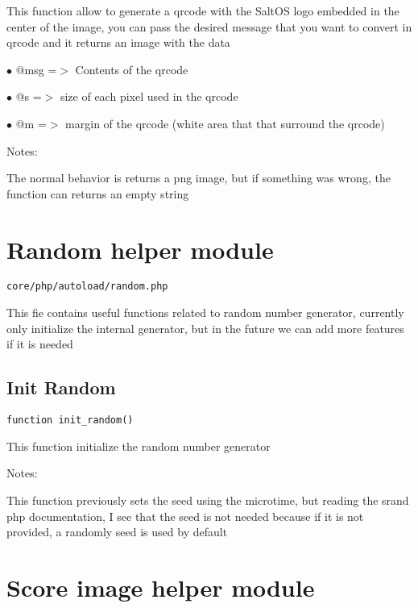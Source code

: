 \documentclass[a4paper]{book}
\begin{document}
This function allow to generate a qrcode with the SaltOS logo embedded
in the center of the image, you can pass the desired message that you
want to convert in qrcode and it returns an image with the data

\begin{compactitem}
\item[\color{myblue}$\bullet$] @msg =$>$ Contents of the qrcode
\item[\color{myblue}$\bullet$] @s   =$>$ size of each pixel used in the qrcode
\item[\color{myblue}$\bullet$] @m   =$>$ margin of the qrcode (white area that that surround the qrcode)
\end{compactitem}

Notes:

The normal behavior is returns a png image, but if something was wrong,
the function can returns an empty string

\hypertarget{toc212}{}
\section{Random helper module}

\begin{lstlisting}
core/php/autoload/random.php
\end{lstlisting}

This fie contains useful functions related to random number generator, currently only initialize
the internal generator, but in the future we can add more features if it is needed

\hypertarget{toc213}{}
\subsection{Init Random}

\begin{lstlisting}
function init_random()
\end{lstlisting}

This function initialize the random number generator

Notes:

This function previously sets the seed using the microtime, but reading
the srand php documentation, I see that the seed is not needed because
if it is not provided, a randomly seed is used by default

\hypertarget{toc214}{}
\section{Score image helper module}
\end{document}
